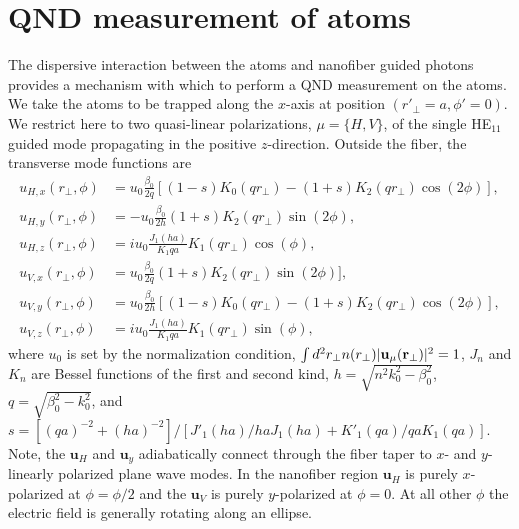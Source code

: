 \documentclass[preprint,aps,pra,onecolumn]{revtex4-1} %
\begin{document}
\section{QND measurement of atoms}
The dispersive interaction between the atoms and nanofiber guided photons provides a mechanism with which to perform a QND measurement on the atoms.  We take the atoms to be trapped along the $x$-axis at position $(r'_\perp =a, \phi' =0)$.  We restrict here to two quasi-linear polarizations, $\mu =\{H,V\}$, of the single HE$_{11}$ guided mode propagating in the positive $z$-direction.  Outside the fiber, the transverse mode functions are~\cite{tong_single-mode_2004,kien_field_2004}
\begin{align}
u_{H,x}(r_\perp,\phi) &= u_0 \frac{\beta_0}{2 q}[(1-s)K_0(q r_\perp) - (1+s)K_2(q r_\perp) \cos(2 \phi)], \\
u_{H,y}(r_\perp,\phi) &=-u_0 \frac{\beta_0}{2 h}  (1+s)K_2(q r_\perp) \sin(2 \phi) ,\\
u_{H,z}(r_\perp,\phi) &=iu_0 \frac{J_1(ha)}{K_1{qa}} K_1(q r_\perp) \cos(\phi), \\
u_{V,x}(r_\perp,\phi) &= u_0 \frac{\beta_0}{2 q}(1+s)K_2(q r_\perp) \sin(2 \phi)] ,\\
u_{V,y}(r_\perp,\phi) &=u_0 \frac{\beta_0}{2 h} [(1-s)K_0(q r_\perp) - (1+s)K_2(q r_\perp) \cos(2 \phi)], \\
u_{V,z}(r_\perp,\phi) &=iu_0 \frac{J_1(ha)}{K_1{qa}}K_1(q r_\perp) \sin(\phi), 
\end{align}
where $u_0$ is set by the normalization condition, $\int d^2 r_\perp n(r_\perp) | \mathbf{u}_\mu(\mathbf{r}_\perp)|^2=1$, $J_n$ and $K_n$ are Bessel functions of the first and second kind, $h=\sqrt{n^2 k_0^2 - \beta_0^2}$, $q=\sqrt{\beta_0^2- k_0^2}$, and $s = [(q a)^{-2} + (h a)^{-2}]/[J'_1(ha)/haJ_1(ha) + K'_1(qa)/qaK_1(qa)]$.  Note, the $\mathbf{u}_H$ and $\mathbf{u}_y$ adiabatically connect through the fiber taper to $x$- and $y$-linearly polarized plane wave modes.  In the nanofiber region $\mathbf{u}_H$ is purely $x$-polarized at $\phi = \phi/2$ and the  $\mathbf{u}_V$ is purely $y$-polarized at $\phi = 0$.  At all other $\phi$ the electric field is generally rotating along an ellipse.  
\end{document}
